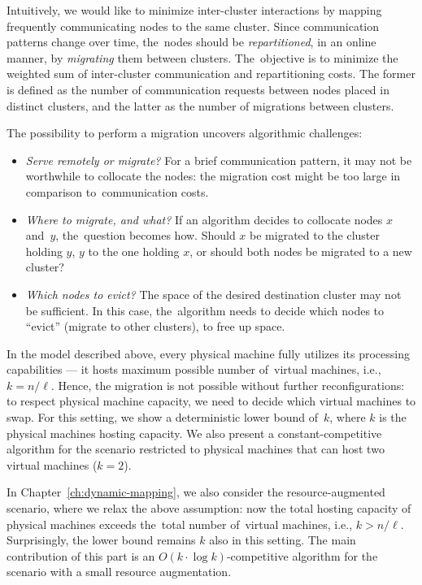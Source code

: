 Intuitively, we would like to minimize inter-cluster
interactions by mapping frequently communicating nodes to the same cluster.
Since communication patterns change over time, the~nodes should be \emph{repartitioned}, in
an online manner, by \emph{migrating} them between clusters.
The~objective is to minimize the weighted sum of inter-cluster communication and repartitioning costs.
The former is defined as the number of communication requests between nodes placed in distinct clusters, and the latter as the number of migrations between clusters.


The possibility to perform a migration uncovers algorithmic challenges:
\begin{itemize}

\item \emph{Serve remotely or migrate?} For a brief communication
pattern, it may not be worthwhile to collocate the nodes: the migration cost might
be too large in comparison to~communication costs.

\item \emph{Where to migrate, and what?}
If an algorithm decides to collocate nodes $x$ and~$y$, the~question becomes
how. Should $x$ be migrated to the cluster holding $y$, $y$ to the one holding
$x$, or should both nodes be migrated to a new cluster?

\item \emph{Which nodes to evict?}
The space of the desired destination cluster may not be sufficient. In
this case, the~algorithm needs to decide which nodes to ``evict'' (migrate to
other clusters), to free up space.

\end{itemize}

In the model described above, every physical machine fully utilizes its processing capabilities --- it hosts maximum possible number of~virtual machines, i.e., $k=n/\ell$.
Hence, the migration is not possible without further reconfigurations: to respect physical machine capacity, we need to decide which virtual machines to swap.
For this setting, we show a deterministic lower bound of~$k$, where $k$ is the physical machines hosting capacity.
We also present a constant-competitive algorithm for the scenario restricted to physical machines that can host two virtual machines ($k = 2$).

In Chapter~\ref{ch:dynamic-mapping}, we also consider the resource-augmented scenario, where we relax the above assumption: now the total hosting capacity of physical machines exceeds the~total number of~virtual machines, i.e., $k > n/\ell$.
Surprisingly, the lower bound remains $k$ also in this setting.
The main contribution of this part is an $O(k\cdot \log k)$-competitive algorithm for the scenario with a small resource augmentation.

